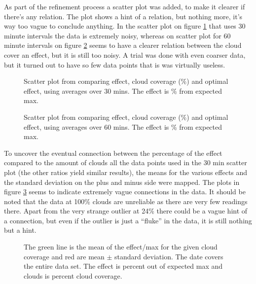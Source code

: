 As part of the refinement process a scatter plot was added, to make it
clearer if there's any relation.  The plot shows a hint of a relation,
but nothing more, it's way too vague to conclude anything.  In the
scatter plot on figure \ref{fig:scatter30} that uses 30 minute
intervals the data is extremely noisy, whereas on scatter plot for 60
minute intervals on figure \ref{fig:scatter60} seems to have a clearer
relation between the cloud cover an effect, but it is still too noisy.
A trial was done with even coarser data, but it turned out to have so
few data points that is was virtually useless.

\begin{figure}
  \centering
  \tiny
  
  \caption{Scatter plot from comparing effect, cloud coverage (\%) and
    optimal effect, using averages over 30 mins.  The effect is \%
    from expected max.}
  \label{fig:scatter30}
\end{figure}

\begin{figure}
  \centering
  \tiny
  
  \caption{Scatter plot from comparing effect, cloud coverage (\%) and
    optimal effect, using averages over 60 mins.  The effect is \%
    from expected max.}
  \label{fig:scatter60}
\end{figure}

To uncover the eventual connection between the percentage of the
effect compared to the amount of clouds all the data points used in
the 30 min scatter plot (the other ratios yield similar results),
the means for the various effects and the standard deviation on the
plus and minus side were mapped.  The plots in figure
\ref{fig:stattotal} seems to indicate extremely vague connections in
the data.  It should be noted that the data at 100\% clouds are
unreliable as there are very few readings there.  Apart from the very
strange outlier at 24\% there could be a vague hint of a connection,
but even if the outlier is just a ``fluke'' in the data, it is still
nothing but a hint.

\begin{figure}
  \centering
  \tiny
  
  \caption{The green line is the mean of the effect/max for the given
    cloud coverage and red are mean $\pm$ standard deviation.  The
    date covers the entire data set.  The effect is percent out of
    expected max and clouds is percent cloud coverage.}
  \label{fig:stattotal}
\end{figure}


